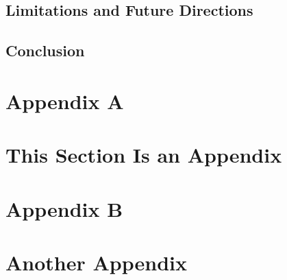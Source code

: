\documentclass[
  american,
  letterpaper,
  12pt]{article}
\begin{document}
\subsection{Limitations and Future
Directions}\label{limitations-and-future-directions}

\subsection{Conclusion}\label{conclusion}

\clearpage

\section{Appendix A}

\section{This Section Is an Appendix}\label{apx-a}

\clearpage

\section{Appendix B}

\section{Another Appendix}\label{apx-b}
\end{document}
